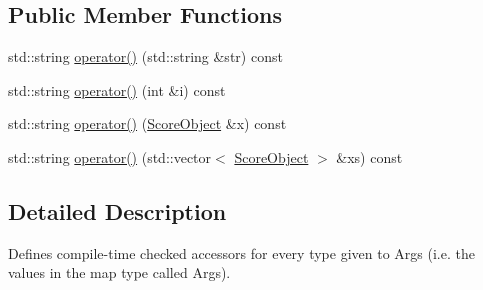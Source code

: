 \subsection*{Public Member Functions}
\begin{DoxyCompactItemize}
\item 
std\-::string \hyperlink{classget_string_arg_a0a467143ebba5978fe9a363d0d31ff3b}{operator()} (std\-::string \&str) const 
\item 
std\-::string \hyperlink{classget_string_arg_adae14b089252bc8e2203da2a3c74712d}{operator()} (int \&i) const 
\item 
std\-::string \hyperlink{classget_string_arg_a9e7d8e2a11b813c4a4dc3d7bbc610d82}{operator()} (\hyperlink{class_score_object}{Score\-Object} \&x) const 
\item 
std\-::string \hyperlink{classget_string_arg_ab910bbfbe751febe0e984e12a903bf58}{operator()} (std\-::vector$<$ \hyperlink{class_score_object}{Score\-Object} $>$ \&xs) const 
\end{DoxyCompactItemize}


\subsection{Detailed Description}
Defines compile-\/time checked accessors for every type given to Args (i.\-e. the values in the map type called Args). 

